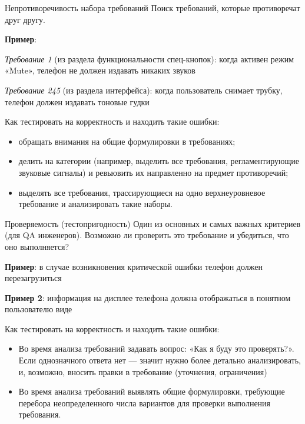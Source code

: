 \documentclass{beamer}
\begin{document}
\begin{frame}[t]{Непротиворечивость набора требований }
Поиск требований, которые противоречат друг другу. 

\textbf{Пример}: 

\textit{Требование 1} (из раздела функциональности спец-кнопок): когда активен режим «Mute», телефон не должен издавать никаких звуков

\textit{Требование 245} (из раздела интерфейса): когда пользователь снимает трубку, телефон должен издавать тоновые гудки

Как тестировать на корректность и находить такие ошибки:
\begin{itemize}
\item обращать внимания на общие формулировки в требованиях; 
\item делить на категории (например, выделить все требования, регламентирующие
звуковые сигналы) и ревьювить их направленно на предмет противоречий;
\item выделять все требования, трассирующиеся на одно верхнеуровневое требование
и анализировать такие наборы. 
\end{itemize}
\end{frame}

\begin{frame}[t]{Проверяемость (тестопригодность)}
Один из основных и самых важных критериев (для QA инженеров). Возможно ли проверить это требование и убедиться, что оно выполняется?

\textbf{Пример}: в случае возникновения критической ошибки телефон должен
перезагрузиться

\textbf{Пример 2}: информация на дисплее телефона должна отображаться в понятном
пользователю виде

Как тестировать на корректность и находить такие ошибки:
\begin{itemize}
\item Во время анализа требований задавать вопрос: «Как я буду это проверять?». Если
однозначного ответа нет — значит нужно более детально анализировать, и,
возможно, вносить правки в требование (уточнения, ограничения)
\item Во время анализа требований выявлять общие формулировки, требующие
перебора неопределенного числа вариантов для проверки выполнения
требования.
\end{itemize}
\end{frame}
\end{document}
